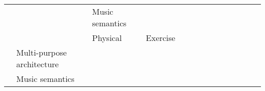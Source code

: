 \begin{tabular}{p{1.5cm}p{1.5cm}p{1.5cm}p{1.5cm}p{0.6cm}p{0.6cm}p{0.6cm}p{0.6cm}p{0.6cm}p{0.6cm}p{0.6cm}p{0.6cm}p{0.6cm}p{0.6cm}}
                                &                 & Music semantics &   &                                                             &                                                                                                           \cite{Stober2014} &                                                                        &                                      &                                                            &                      &                       &                                 &                         &                                                                      \\
                                &                 & Physical & Exercise &                                                             &                                                                                                            \cite{Ghosh2018} &                                                                        &                                      &                                                            &                      &  \cite{Gordienko2017} &                                 &                         &                                                                      \\
                                & Multi-purpose architecture &   &   &                                             \cite{Lee2018a} &                                                                                                           \cite{Zhang2018a} &                                                                        &                                      &                                                            &                      &                       &                \cite{Deiss2018} &                         &                                                                      \\
                                & Music semantics &   &   &                                                             &                                                                                                           \cite{Raposo2017} &                                                                        &                                      &                                                            &                      &                       &                                 &                         &                                                                      \\

\end{tabular}
